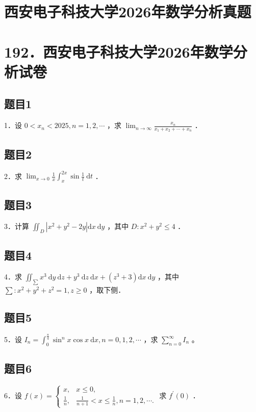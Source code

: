 \documentclass{article}
\begin{document}
\section*{西安电子科技大学2026年数学分析真题}
\section*{192．西安电子科技大学2026年数学分析试卷}

\subsection{题目1}
1．设 \(0<x_{n}<2025, n=1,2, \cdots\) ，求 \(\lim _{n \rightarrow \infty} \frac{x_{n}}{x_{1}+x_{2}+\cdots+x_{n}}\) ．

\subsection{题目2}
2．求 \(\lim _{x \rightarrow 0} \frac{1}{x} \int_{x}^{2 x} \sin \frac{1}{t} \mathrm{~d} t\) ．

\subsection{题目3}
3．计算 \(\iint_{D}\left|x^{2}+y^{2}-2 y\right| \mathrm{d} x \mathrm{~d} y\) ，其中 \(D: x^{2}+y^{2} \leq 4\) ．

\subsection{题目4}
4．求 \(\iint_{\sum} x^{3} \mathrm{~d} y \mathrm{~d} z+y^{3} \mathrm{~d} z \mathrm{~d} x+\left(z^{3}+3\right) \mathrm{d} x \mathrm{~d} y\) ，其中 \(\sum: x^{2}+y^{2}+z^{2}=1, z \geq 0\) ，取下侧．

\subsection{题目5}
5．设 \(I_{n}=\int_{0}^{\frac{\pi}{4}} \sin ^{n} x \cos x \mathrm{~d} x, n=0,1,2, \cdots\) ，求 \(\sum_{n=0}^{\infty} I_{n}\) 。

\subsection{题目6}
6．设 \(f(x)=\left\{\begin{aligned} x, & x \leq 0, \\ \frac{1}{n}, & \frac{1}{n+1}<x \leq \frac{1}{n}, n=1,2, \cdots .\end{aligned}\right.\) 求 \(f^{\prime}(0)\) ．
\end{document}
